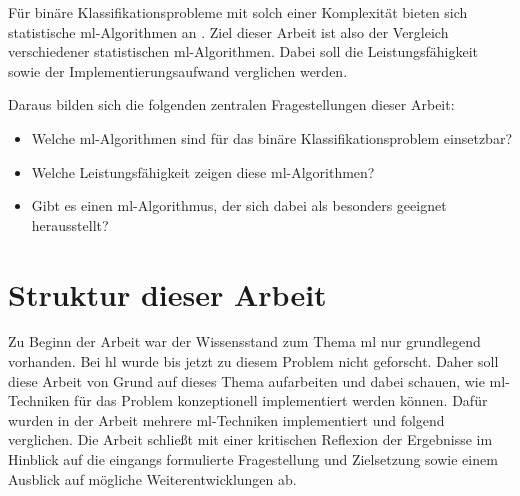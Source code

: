 Für binäre Klassifikationsprobleme mit solch einer Komplexität bieten sich statistische \gls{ml}-Algorithmen an \cite{Fraunhofer2018}. 
Ziel dieser Arbeit ist also der Vergleich verschiedener statistischen \gls{ml}-Algorithmen.
Dabei soll die Leistungsfähigkeit sowie der Implementierungsaufwand verglichen werden.

Daraus bilden sich die folgenden zentralen Fragestellungen dieser Arbeit:
\begin{itemize}[noitemsep]
    \item Welche \gls{ml}-Algorithmen sind für das binäre Klassifikationsproblem einsetzbar?
    \item Welche Leistungsfähigkeit zeigen diese \gls{ml}-Algorithmen?
    \item Gibt es einen \gls{ml}-Algorithmus, der sich dabei als besonders geeignet herausstellt?
\end{itemize}


\section{Struktur dieser Arbeit}

Zu Beginn der Arbeit war der Wissensstand zum Thema \gls{ml} nur grundlegend vorhanden. 
Bei \gls{hl} wurde bis jetzt zu diesem Problem nicht geforscht. 
Daher soll diese Arbeit von Grund auf dieses Thema aufarbeiten und dabei schauen, wie \gls{ml}-Techniken für das Problem konzeptionell implementiert werden können.
Dafür wurden in der Arbeit mehrere \gls{ml}-Techniken implementiert und folgend verglichen. 
Die Arbeit schließt mit einer kritischen Reflexion der Ergebnisse im Hinblick auf die eingangs formulierte Fragestellung und Zielsetzung sowie einem Ausblick auf mögliche Weiterentwicklungen ab.



